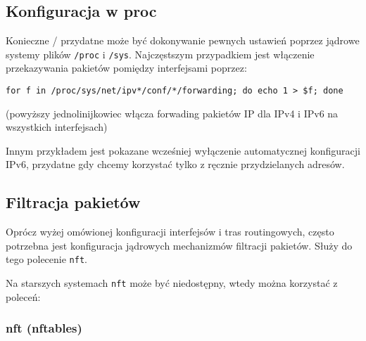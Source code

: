 \documentclass{pdfBooklets}
\begin{document}
\subsection{Konfiguracja w proc}

Konieczne / przydatne może być dokonywanie pewnych ustawień poprzez jądrowe systemy plików \Verb$/proc$ i \Verb$/sys$.
Najczęstszym przypadkiem jest włączenie przekazywania pakietów pomiędzy interfejsami poprzez:

\begin{verbatim}
for f in /proc/sys/net/ipv*/conf/*/forwarding; do echo 1 > $f; done
\end{verbatim}
(powyższy jednolinijkowiec włącza forwading pakietów IP dla IPv4 i IPv6 na wszystkich interfejsach)

Innym przykładem jest pokazane wcześniej wyłączenie automatycznej konfiguracji IPv6, przydatne gdy chcemy korzystać tylko z ręcznie przydzielanych adresów.


\subsection{Filtracja pakietów}

Oprócz wyżej omówionej konfiguracji interfejsów i tras routingowych, często potrzebna jest konfiguracja jądrowych mechanizmów filtracji pakietów.
Służy do tego polecenie \Verb#nft#.

Na starszych systemach \Verb#nft# może być niedostępny, wtedy można korzystać z poleceń:

\subsubsection{nft (nftables)}
\end{document}
